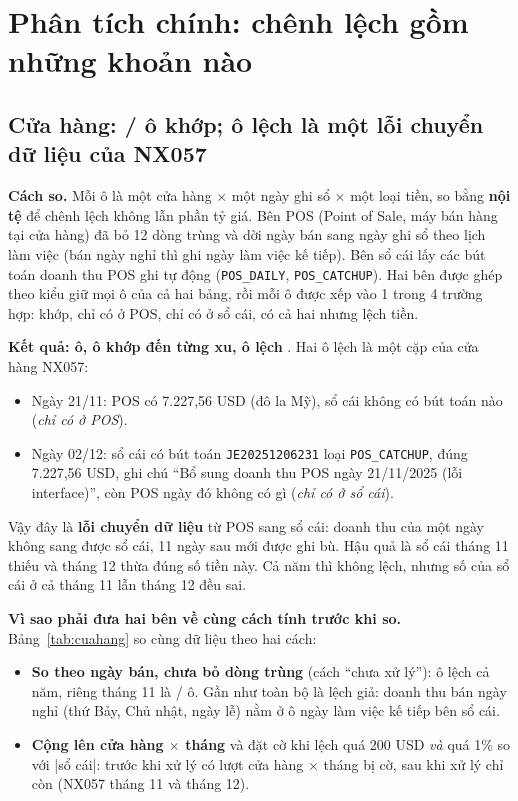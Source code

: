 \section{Phân tích chính: chênh lệch gồm những khoản nào}

\subsection{Cửa hàng: \SoOCuaHangKhop/\SoOCuaHang{} ô khớp; \SoOCuaHangLech{} ô lệch là một lỗi chuyển dữ liệu của NX057}

\textbf{Cách so.} Mỗi ô là một cửa hàng $\times$ một ngày ghi sổ $\times$ một loại tiền, so bằng \textbf{nội tệ} để chênh lệch không lẫn phần tỷ giá. Bên POS (Point of Sale, máy bán hàng tại cửa hàng) đã bỏ 12 dòng trùng và dời ngày bán sang ngày ghi sổ theo lịch làm việc (bán ngày nghỉ thì ghi ngày làm việc kế tiếp). Bên sổ cái lấy các bút toán doanh thu POS ghi tự động (\texttt{POS\_DAILY}, \texttt{POS\_CATCHUP}). Hai bên được ghép theo kiểu giữ mọi ô của cả hai bảng, rồi mỗi ô được xếp vào 1 trong 4 trường hợp: khớp, chỉ có ở POS, chỉ có ở sổ cái, có cả hai nhưng lệch tiền.

\textbf{Kết quả: \SoOCuaHang{} ô, \SoOCuaHangKhop{} ô khớp đến từng xu, \SoOCuaHangLech{} ô lệch} . Hai ô lệch là một cặp của cửa hàng NX057:
\begin{itemize}
  \item Ngày 21/11: POS có 7.227,56 USD (đô la Mỹ), sổ cái không có bút toán nào (\emph{chỉ có ở POS}).
  \item Ngày 02/12: sổ cái có bút toán \texttt{JE20251206231} loại \texttt{POS\_CATCHUP}, đúng 7.227,56 USD, ghi chú ``Bổ sung doanh thu POS ngày 21/11/2025 (lỗi interface)'', còn POS ngày đó không có gì (\emph{chỉ có ở sổ cái}).
\end{itemize}
Vậy đây là \textbf{lỗi chuyển dữ liệu} từ POS sang sổ cái: doanh thu của một ngày không sang được sổ cái, 11 ngày sau mới được ghi bù. Hậu quả là sổ cái tháng 11 thiếu và tháng 12 thừa đúng số tiền này. Cả năm thì không lệch, nhưng số của sổ cái ở cả tháng 11 lẫn tháng 12 đều sai.

\textbf{Vì sao phải đưa hai bên về cùng cách tính trước khi so.} Bảng~\ref{tab:cuahang} so cùng dữ liệu theo hai cách:
\begin{itemize}
  \item \textbf{So theo ngày bán, chưa bỏ dòng trùng} (cách ``chưa xử lý''): \SoOLechNgayBanNam{} ô lệch cả năm, riêng tháng 11 là \SoOLechNgayBanTMM{}/\SoOThangMuoiMot{} ô. Gần như toàn bộ là lệch giả: doanh thu bán ngày nghỉ (thứ Bảy, Chủ nhật, ngày lễ) nằm ở ô ngày làm việc kế tiếp bên sổ cái.
  \item \textbf{Cộng lên cửa hàng $\times$ tháng} và đặt cờ khi lệch quá 200 USD \emph{và} quá 1\% so với |sổ cái|: trước khi xử lý có \SoCHVuotTruocNam{} lượt cửa hàng $\times$ tháng bị cờ, sau khi xử lý chỉ còn \SoCHVuotSauNam{} (NX057 tháng 11 và tháng 12).
\end{itemize}

